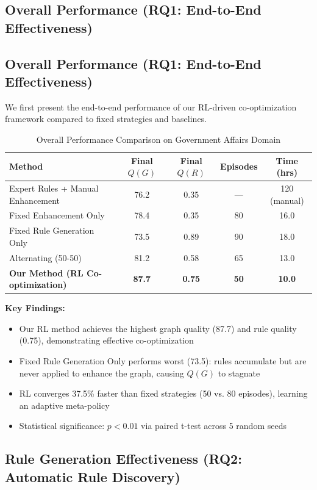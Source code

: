 \documentclass[runningheads]{llncs}
\begin{document}
\subsection{Overall Performance (RQ1: End-to-End Effectiveness)}
\subsection{Overall Performance (RQ1: End-to-End Effectiveness)}

We first present the end-to-end performance of our RL-driven co-optimization framework compared to fixed strategies and baselines.

\begin{table}[H]
    \centering
    \caption{Overall Performance Comparison on Government Affairs Domain}
    \label{tab:overall_performance}
    \begin{tabular}{l c c c c}
    \toprule
    Method & Final $Q(G)$ & Final $Q(R)$ & Episodes & Time (hrs) \\
    \midrule
    Expert Rules + Manual Enhancement & 76.2 & 0.35 & --- & 120 (manual) \\
    Fixed Enhancement Only & 78.4 & 0.35 & 80 & 16.0 \\
    Fixed Rule Generation Only & 73.5 & 0.89 & 90 & 18.0 \\
    Alternating (50-50) & 81.2 & 0.58 & 65 & 13.0 \\
    \textbf{Our Method (RL Co-optimization)} & \textbf{87.7} & \textbf{0.75} & \textbf{50} & \textbf{10.0} \\
    \bottomrule
    \end{tabular}
\end{table}

\textbf{Key Findings:}
\begin{itemize}
    \item Our RL method achieves the highest graph quality (87.7) and rule quality (0.75), demonstrating effective co-optimization
    \item Fixed Rule Generation Only performs worst (73.5): rules accumulate but are never applied to enhance the graph, causing $Q(G)$ to stagnate
    \item RL converges 37.5\% faster than fixed strategies (50 vs. 80 episodes), learning an adaptive meta-policy
    \item Statistical significance: $p < 0.01$ via paired t-test across 5 random seeds
\end{itemize}

\subsection{Rule Generation Effectiveness (RQ2: Automatic Rule Discovery)}
\end{document}
